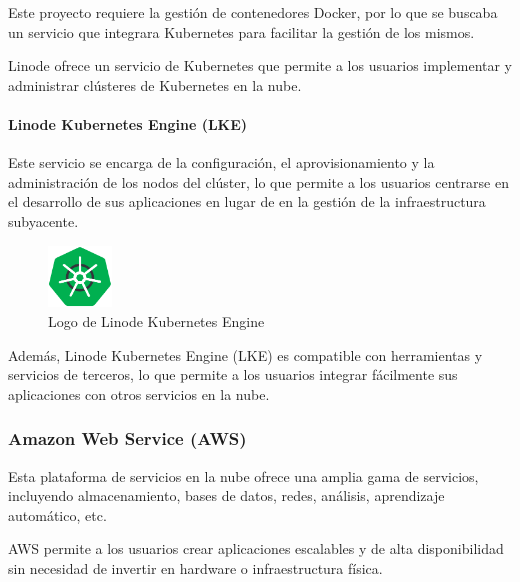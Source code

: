                 Este proyecto requiere la gestión de contenedores Docker, por lo que se buscaba un servicio que integrara Kubernetes para facilitar la gestión de los mismos.
                
                Linode ofrece un servicio de Kubernetes que permite a los usuarios implementar y administrar clústeres de Kubernetes en la nube.

                \paragraph{Linode Kubernetes Engine (LKE)}

                    Este servicio se encarga de la configuración, el aprovisionamiento y la administración de los nodos del clúster, lo que permite a los usuarios centrarse en el desarrollo de sus aplicaciones en lugar de en la gestión de la infraestructura subyacente.
                    
                    \begin{figure}[htbp]
                        \centering
    
                        \includegraphics[width=0.15\textwidth]{images/Logos/lke.png}
                        \caption{Logo de Linode Kubernetes Engine}
    
                        \label{fig:lke-logo}
                    \end{figure}
                    
                    Además, Linode Kubernetes Engine (LKE) es compatible con herramientas y servicios de terceros, lo que permite a los usuarios integrar fácilmente sus aplicaciones con otros servicios en la nube.


            \subsubsection{Amazon Web Service (AWS)}
                \label{sec:aws}

                Esta plataforma de servicios en la nube ofrece una amplia gama de servicios, incluyendo almacenamiento, bases de datos, redes, análisis, aprendizaje automático, etc.
                
                AWS permite a los usuarios crear aplicaciones escalables y de alta disponibilidad sin necesidad de invertir en hardware o infraestructura física.

